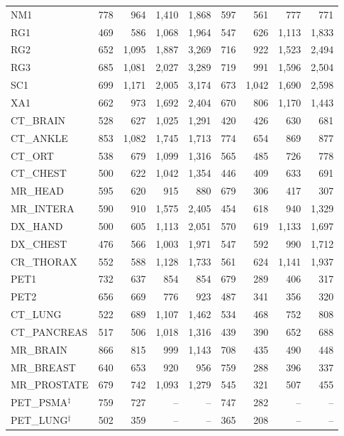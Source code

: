 \documentclass[journal]{IEEEtran}
\begin{document}
\begin{table}[htbp]
\begin{tabular}{l|rrrr|rrrr}
NM1                  & 778 & 964 & 1{,}410 & 1{,}868 & 597 & 561 & 777 & 771 \\
RG1                  & 469 & 586 & 1{,}068 & 1{,}964 & 547 & 626 & 1{,}113 & 1{,}833 \\
RG2                  & 652 & 1{,}095 & 1{,}887 & 3{,}269 & 716 & 922 & 1{,}523 & 2{,}494 \\
RG3                  & 685 & 1{,}081 & 2{,}027 & 3{,}289 & 719 & 991 & 1{,}596 & 2{,}504 \\
SC1                  & 699 & 1{,}171 & 2{,}005 & 3{,}174 & 673 & 1{,}042 & 1{,}690 & 2{,}598 \\
XA1                  & 662 & 973 & 1{,}692 & 2{,}404 & 670 & 806 & 1{,}170 & 1{,}443 \\
CT\_BRAIN            & 528 & 627 & 1{,}025 & 1{,}291 & 420 & 426 & 630 & 681 \\
CT\_ANKLE            & 853 & 1{,}082 & 1{,}745 & 1{,}713 & 774 & 654 & 869 & 877 \\
CT\_ORT              & 538 & 679 & 1{,}099 & 1{,}316 & 565 & 485 & 726 & 778 \\
CT\_CHEST            & 500 & 622 & 1{,}042 & 1{,}354 & 446 & 409 & 633 & 691 \\
MR\_HEAD             & 595 & 620 & 915 & 880 & 679 & 306 & 417 & 307 \\
MR\_INTERA           & 590 & 910 & 1{,}575 & 2{,}405 & 454 & 618 & 940 & 1{,}329 \\
DX\_HAND             & 500 & 605 & 1{,}113 & 2{,}051 & 570 & 619 & 1{,}133 & 1{,}697 \\
DX\_CHEST            & 476 & 566 & 1{,}003 & 1{,}971 & 547 & 592 & 990 & 1{,}712 \\
CR\_THORAX           & 552 & 588 & 1{,}128 & 1{,}733 & 561 & 624 & 1{,}141 & 1{,}937 \\
PET1                 & 732 & 637 & 854 & 854 & 679 & 289 & 406 & 317 \\
PET2                 & 656 & 669 & 776 & 923 & 487 & 341 & 356 & 320 \\
CT\_LUNG             & 522 & 689 & 1{,}107 & 1{,}462 & 534 & 468 & 752 & 808 \\
CT\_PANCREAS         & 517 & 506 & 1{,}018 & 1{,}316 & 439 & 390 & 652 & 688 \\
MR\_BRAIN            & 866 & 815 & 999 & 1{,}143 & 708 & 435 & 490 & 448 \\
MR\_BREAST           & 640 & 653 & 920 & 956 & 759 & 288 & 396 & 337 \\
MR\_PROSTATE         & 679 & 742 & 1{,}093 & 1{,}279 & 545 & 321 & 507 & 455 \\
PET\_PSMA$^\ddagger$ & 759 & 727 & -- & -- & 747 & 282 & -- & -- \\
PET\_LUNG$^\ddagger$ & 502 & 359 & -- & -- & 365 & 208 & -- & -- \\
\bottomrule
\end{tabular}
\end{table}
\end{document}
